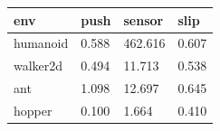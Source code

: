 \begin{tabular}{llll}
\toprule
env & push & sensor & slip \\
\midrule
humanoid & 0.588 & 462.616 & 0.607 \\
walker2d & 0.494 & 11.713 & 0.538 \\
ant & 1.098 & 12.697 & 0.645 \\
hopper & 0.100 & 1.664 & 0.410 \\
\bottomrule
\end{tabular}
